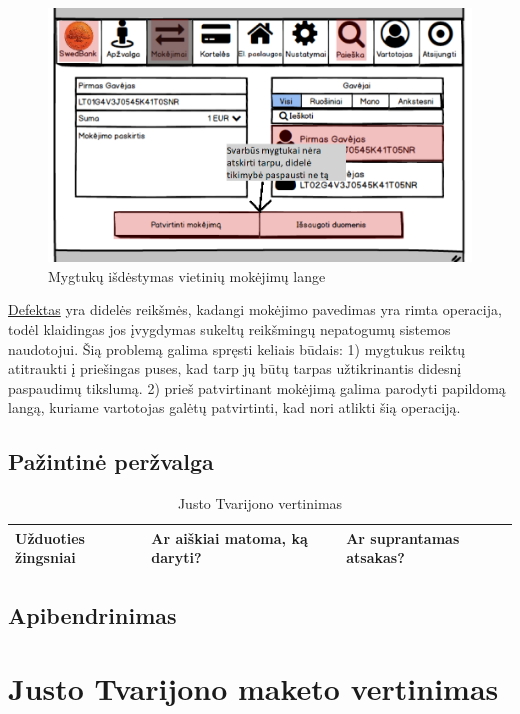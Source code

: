 \documentclass[oneside]{VUMIFPSkursinis}
\begin{document}
\begin{figure}[!htb]
	\includegraphics[scale=0.55]{MokejimoPatvirtinimasKlaiduPrevencija.png}
  \caption{Mygtukų išdėstymas vietinių mokėjimų lange}
	\label{fig:klaiduPrevencijaMygtukai}
\end{figure}
\hyperref[lentele:klaiduPrevencijaJ]{Defektas} yra didelės reikšmės, kadangi mokėjimo pavedimas yra rimta operacija, todėl klaidingas jos įvygdymas sukeltų reikšmingų nepatogumų sistemos naudotojui. Šią problemą galima spręsti keliais būdais: 1) mygtukus reiktų atitraukti į priešingas puses, kad tarp jų būtų tarpas užtikrinantis didesnį paspaudimų tikslumą. 2) prieš patvirtinant mokėjimą galima parodyti papildomą langą, kuriame vartotojas galėtų patvirtinti, kad nori atlikti šią operaciją.

\subsection{Pažintinė peržvalga}
\begin{center}
\begin{table}[h]
\begin{tabular}{|p{5cm}|p{5cm}|p{5cm}|}
	\hline
	Užduoties žingsniai & Ar aiškiai matoma, ką daryti? & Ar suprantamas atsakas? \\ \hline
\end{tabular}
\caption{Justo Tvarijono vertinimas}
\end{table}
\end{center}
\subsection{Apibendrinimas}
\section{Justo Tvarijono maketo vertinimas}
\end{document}
